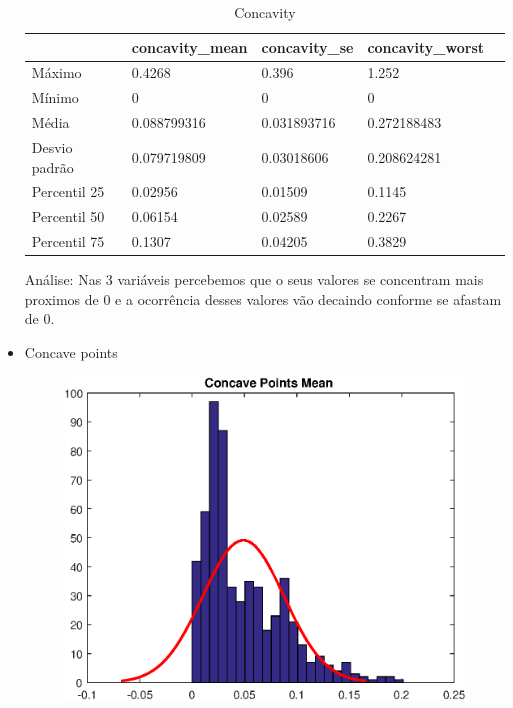 \documentclass[11pt,a4paper]{article}
\numberwithin{equation}{section}
\begin{document}
\begin{itemize}
\begin{table}[H]
\centering
\caption{Concavity}
\label{my-label}
\begin{tabular}{lllll} \hline
              & concavity\_mean & concavity\_se & concavity\_worst &  \\ \hline
Máximo        & 0.4268          & 0.396         & 1.252            &  \\
Mínimo        & 0               & 0             & 0                &  \\
Média         & 0.088799316     & 0.031893716   & 0.272188483      &  \\
Desvio padrão & 0.079719809     & 0.03018606    & 0.208624281      &  \\
Percentil 25  & 0.02956         & 0.01509       & 0.1145           &  \\
Percentil 50  & 0.06154         & 0.02589       & 0.2267           &  \\
Percentil 75  & 0.1307          & 0.04205       & 0.3829           & \\ \hline
\end{tabular}
\end{table}

Análise: Nas 3 variáveis percebemos que o seus valores se concentram mais proximos de 0 e a ocorrência desses valores vão decaindo conforme se afastam de 0.

\item Concave points
\begin{figure}[H]
\centering
  \includegraphics[width=.4\linewidth]{./img/concave_points_mean}
  \label{fig:test1}
\end{figure}%


\end{itemize}
\end{document}
